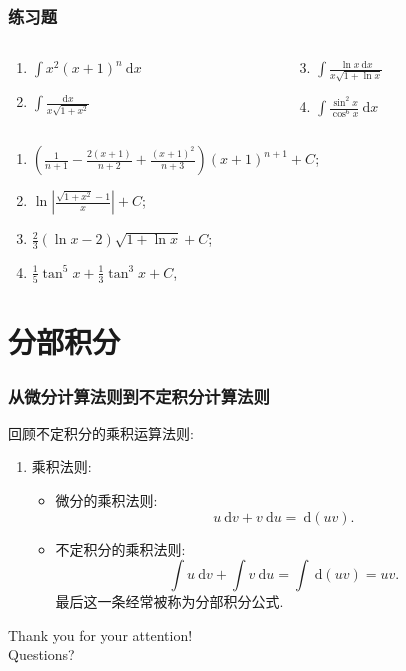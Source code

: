 \documentclass[
10pt,
aspectratio=43,
]{beamer}
\begin{document}
\begin{frame}
	\frametitle{练习题}
	\everymath{\displaystyle}
	\begin{block}{}
		\begin{columns}[onlytextwidth]
			\begin{column}{0.5\textwidth}
				\begin{enumerate}
					\item $\int x^2(x+1)^n \mathrm{~d} x$
					\item $\int \frac{\mathrm{d} x}{x \sqrt{1+x^2}}$
				\end{enumerate}
			\end{column}
			\begin{column}{0.5\textwidth}
				\begin{enumerate}
					\setcounter{enumi}{2}
					\item $\int \frac{\ln x \mathrm{~d} x}{x \sqrt{1+\ln x}}$
					\item $\int \frac{\sin ^2 x}{\cos ^6 x} \mathrm{~d} x$
				\end{enumerate}
			\end{column}
		\end{columns}
	\end{block}
	\begin{exampleblock}{}
				\begin{enumerate}
					\pause \item $\left(\frac{1}{n+1}-\frac{2(x+1)}{n+2}+\frac{(x+1)^2}{n+3}\right)(x+1)^{n+1}+C$;
					\pause \item $\ln\left|\frac{\sqrt{1+x^2}-1}{x}\right|+C$;
					\pause \item $\frac{2}{3}(\ln x-2) \sqrt{1+\ln x}+C$;
					\pause \item $\frac{1}{5} \tan ^5 x+\frac{1}{3} \tan ^3 x+C$,
				\end{enumerate}
	\end{exampleblock}
\end{frame}

\section{分部积分}

\begin{frame}
	\frametitle{从微分计算法则到不定积分计算法则}
	回顾不定积分的乘积运算法则:\pause
	\begin{block}{}
		\begin{enumerate}
			\item 乘积法则:
			      \begin{itemize}
				      \item \pause 微分的乘积法则:
				            $$
					            u\mathrm{~d}v+v\mathrm{~d}u =\mathrm{~d}(uv).
				            $$
				      \item \pause 不定积分的乘积法则:
				            $$
					            \int u\mathrm{~d}v+\int v\mathrm{~d}u=\int\mathrm{~d}(uv) = uv.
				            $$
				            \pause 最后这一条经常被称为分部积分公式.
			      \end{itemize}
		\end{enumerate}
	\end{block}
\end{frame}

\begin{frame}[plain]
	\vfill
	\centering
	{
		\centering \Huge \color{white} Thank you for your attention!\\[10pt]Questions?
	}
	\vfill
\end{frame}
\end{document}
